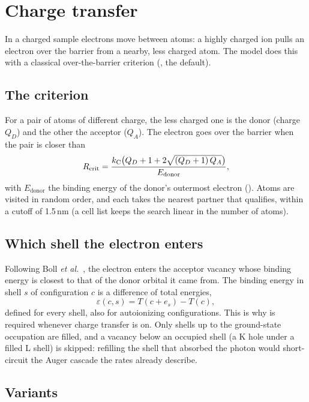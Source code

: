 \chapter{Charge transfer}
\label{ch:ct}

In a charged sample electrons move between atoms: a highly charged ion pulls an electron over the barrier from a
nearby, less charged atom.
The model does this with a classical over-the-barrier criterion (, the default).

\section{The criterion}

For a pair of atoms of different charge, the less charged one is the donor (charge $Q_D$) and the other the
acceptor ($Q_A$).
The electron goes over the barrier when the pair is closer than
\begin{equation}
  R_{\mathrm{crit}} = \frac{k_{\mathrm C}\big(Q_D + 1 + 2\sqrt{(Q_D+1)\,Q_A}\big)}{E_{\mathrm{donor}}},
\end{equation}
with $E_{\mathrm{donor}}$ the binding energy of the donor's outermost electron ().
Atoms are visited in random order, and each takes the nearest partner that qualifies, within a cutoff of 1.5\,nm
(a cell list keeps the search linear in the number of atoms).

\section{Which shell the electron enters}

Following Boll \emph{et al.}~\cite{boll2022}, the electron enters the acceptor vacancy whose binding energy is closest to
that of the donor orbital it came from.
The binding energy in shell $s$ of configuration $c$ is a difference of total energies,
\begin{equation}
  \varepsilon(c,s) = T(c + e_s) - T(c),
\end{equation}
defined for every shell, also for autoionizing configurations.
This is why  is required whenever charge transfer is on.
Only shells up to the ground-state occupation are filled, and a vacancy below an occupied shell (a K hole under a
filled L shell) is skipped: refilling the shell that absorbed the photon would short-circuit the Auger cascade the
rates already describe.

\section{Variants}

